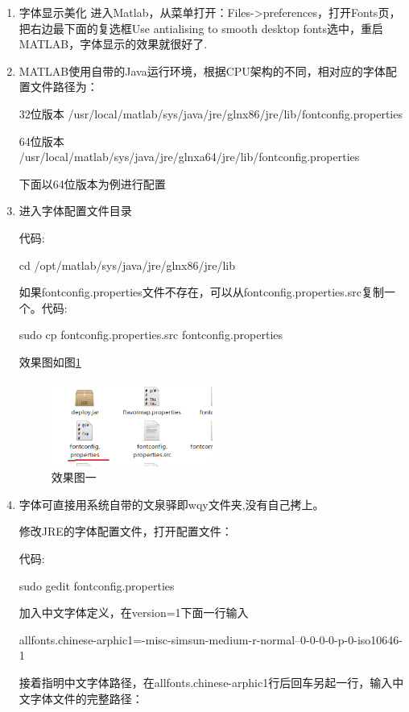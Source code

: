 \documentclass[12pt]{article}
\begin{document}
\begin{enumerate}

\item 字体显示美化  进入Matlab，从菜单打开：Files->preferences，打开Fonts页，把右边最下面的复选框Use  antialising  to  smooth  desktop  fonts选中，重启MATLAB，字体显示的效果就很好了.

\item MATLAB使用自带的Java运行环境，根据CPU架构的不同，相对应的字体配置文件路径为：

32位版本  /usr/local/matlab/sys/java/jre/glnx86/jre/lib/fontconfig.properties

64位版本  /usr/local/matlab/sys/java/jre/glnxa64/jre/lib/fontconfig.properties

下面以64位版本为例进行配置

\item 进入字体配置文件目录

代码:

cd  /opt/matlab/sys/java/jre/glnx86/jre/lib

如果fontconfig.properties文件不存在，可以从fontconfig.properties.src复制一个。代码:

sudo  cp  fontconfig.properties.src  fontconfig.properties

效果图如图\ref{fig:1}
\begin{figure}[!htb] %
\centering
\includegraphics[width=0.5\textwidth]{1.png}
\caption{效果图一}
\label{fig:1}
\end{figure}

\item 字体可直接用系统自带的文泉驿即wqy文件夹,没有自己拷上。

修改JRE的字体配置文件，打开配置文件：

代码:

  sudo  gedit  fontconfig.properties

加入中文字体定义，在version=1下面一行输入

allfonts.chinese-arphic1=-misc-simsun-medium-r-normal--0-0-0-0-p-0-iso10646-1

接着指明中文字体路径，在allfonts.chinese-arphic1行后回车另起一行，输入中文字体文件的完整路径：


\end{enumerate}
\end{document}
